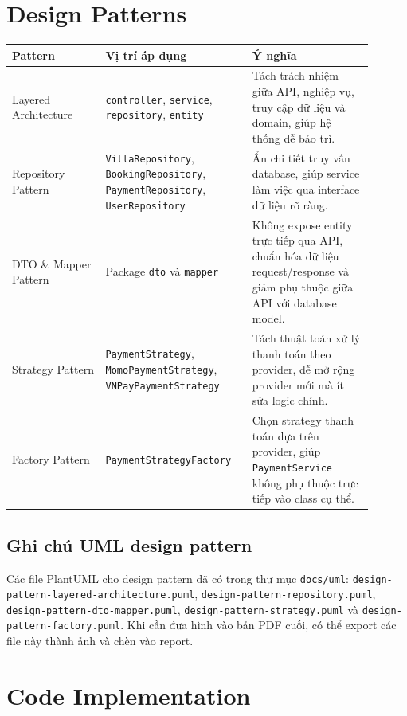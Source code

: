 \documentclass[12pt,a4paper]{article}
\begin{document}
\section{Design Patterns}

\begin{longtable}{|p{0.24\linewidth}|p{0.35\linewidth}|p{0.31\linewidth}|}
\hline
\textbf{Pattern} & \textbf{Vị trí áp dụng} & \textbf{Ý nghĩa} \\
\hline
Layered Architecture & \texttt{controller}, \texttt{service}, \texttt{repository}, \texttt{entity} & Tách trách nhiệm giữa API, nghiệp vụ, truy cập dữ liệu và domain, giúp hệ thống dễ bảo trì. \\
\hline
Repository Pattern & \texttt{VillaRepository}, \texttt{BookingRepository}, \texttt{PaymentRepository}, \texttt{UserRepository} & Ẩn chi tiết truy vấn database, giúp service làm việc qua interface dữ liệu rõ ràng. \\
\hline
DTO \& Mapper Pattern & Package \texttt{dto} và \texttt{mapper} & Không expose entity trực tiếp qua API, chuẩn hóa dữ liệu request/response và giảm phụ thuộc giữa API với database model. \\
\hline
Strategy Pattern & \texttt{PaymentStrategy}, \texttt{MomoPaymentStrategy}, \texttt{VNPayPaymentStrategy} & Tách thuật toán xử lý thanh toán theo provider, dễ mở rộng provider mới mà ít sửa logic chính. \\
\hline
Factory Pattern & \texttt{PaymentStrategyFactory} & Chọn strategy thanh toán dựa trên provider, giúp \texttt{PaymentService} không phụ thuộc trực tiếp vào class cụ thể. \\
\hline
\end{longtable}

\subsection{Ghi chú UML design pattern}

Các file PlantUML cho design pattern đã có trong thư mục \texttt{docs/uml}: \texttt{design-pattern-layered-architecture.puml}, \texttt{design-pattern-repository.puml}, \texttt{design-pattern-dto-mapper.puml}, \texttt{design-pattern-strategy.puml} và \texttt{design-pattern-factory.puml}. Khi cần đưa hình vào bản PDF cuối, có thể export các file này thành ảnh và chèn vào report.

\section{Code Implementation}
\end{document}
